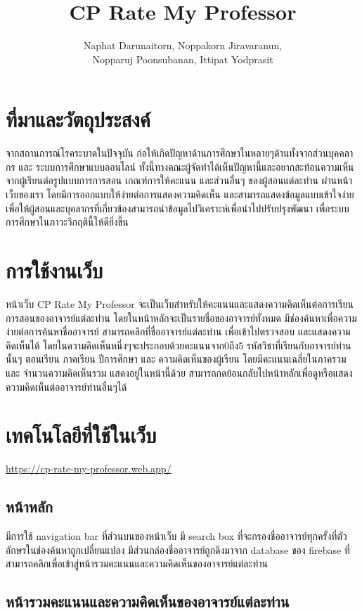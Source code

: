\documentclass[17pt]{extarticle}
\title{CP Rate My Professor}
\author{Naphat Darunaitorn, Noppakorn Jiravaranun,\\ Nopparuj Poonsubanan, Ittipat Yodprasit}
\begin{document}
\maketitle
\section{ที่มาและวัตถุประสงค์}

จากสถานการณ์โรคระบาดในปัจจุบัน
ก่อให้เกิดปัญหาด้านการศึกษาในหลายๆด้านทั้งจากส่วนบุคคลากร และ ระบบการศึกษาแบบออนไลน์
ทั้งนี้ทางคณะผู้จัดทำได้เห็นปัญหานี้และอยากสะท้อนความเห็นจากผู้เรียนต่อรูปแบบการการสอน
เกณฑ์การให้คะแนน และส่วนอื่นๆ ของผู้สอนแต่ละท่าน ผ่านหน้าเว็บของเรา
โดยมีการออกแบบให้ง่ายต่อการแสดงความคิดเห็น และสามารถแสดงข้อมูลแบบเข้าใจง่าย
เพื่อให้ผู้สอนและบุคลากรที่เกี่ยวข้องสามารถนำข้อมูลไปวิเคราะห์เพื่อนำไปปรับปรุงพัฒนา
เพื่อระบบการศึกษาในภาวะวิกฤตินี้ให้ดียิ่งขึ้น

\section{การใช้งานเว็บ}

หน้าเว็บ CP Rate My Professor จะเป็นเว็บสำหรับให้คะแนนและแสดงความคิดเห็นต่อการเรียนการสอนของอาจารย์แต่ละท่าน
โดยในหน้าหลักจะเป็นรายชื่อของอาจารย์ทั้งหมด มีช่องค้นหาเพื่อความง่ายต่อการค้นหาชื่ออาจารย์
สามารถคลิกที่ชื่ออาจารย์แต่ละท่าน เพื่อเข้าไปตรวจสอบ และแสดงความคิดเห็นได้
โดยในความคิดเห็นหนึ่งๆจะประกอบด้วยคะแนนจาก0ถึง5 รหัสวิชาที่เรียนกับอาจารย์ท่านนั้นๆ ตอนเรียน ภาคเรียน ปีการศึกษา และ ความคิดเห็นของผู้เรียน
โดยมีคะแนนเฉลี่ยในภาครวม และ จำนวนความคิดเห็นรวม แสดงอยู่ในหน้านี้ด้วย สามารถกดย้อนกลับไปหน้าหลักเพื่อดูหรือแสดงความคิดเห็นต่ออาจารย์ท่านอื่นๆได้

\section{เทคโนโลยีที่ใช้ในเว็บ}
\url{https://cp-rate-my-professor.web.app/}
\subsection{หน้าหลัก}

มีการใช้ navigation bar ที่ส่วนบนของหน้าเว็บ มี search box ที่จะกรองชื่ออาจารย์ทุกครั้งที่ตัวอักษรในช่องค้นหาถูกเปลี่ยนแปลง มีส่วนกล่องชื่ออาจารย์ถูกดึงมาจาก database ของ firebase
ที่สามารถคลิกเพื่อเข้าสู่หน้ารวมคะแนนและความคิดเห็นของอาจารย์แต่ละท่าน

\subsection{หน้ารวมคะแนนและความคิดเห็นของอาจารย์แต่ละท่าน}
\end{document}

